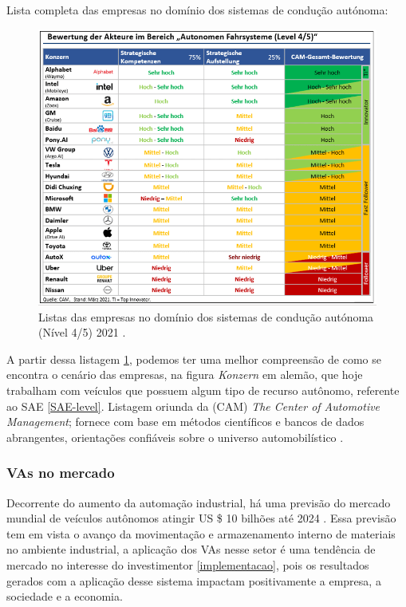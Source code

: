 Lista completa das empresas no domínio dos sistemas de condução autónoma:


\begin{figure}[H]
\centering
\includegraphics[width=16cm]{Figures/grafik.png}
\caption{Listas das empresas no domínio dos sistemas de condução autónoma (Nível 4/5) 2021 \cite{CAM}.}
\label{figura_companies}
\end{figure}

A partir dessa listagem \ref{figura_companies}, podemos ter uma melhor compreensão de como se encontra o cenário das empresas, na figura \textit{Konzern} em alemão, que hoje trabalham com veículos que possuem algum tipo de recurso autônomo, referente ao SAE \ref{SAE-level}. Listagem oriunda da (CAM) \textit{The Center of Automotive Management}; fornece com base em métodos científicos e bancos de dados abrangentes, orientações confiáveis sobre o universo automobilístico \cite{CAM}.

\subsubsection{VAs no mercado}

Decorrente  do aumento da automação industrial, há uma previsão do mercado mundial de veículos autônomos atingir US \$ 10 bilhões até 2024 \cite{mercadoo}. Essa previsão tem em vista o avanço da movimentação e armazenamento interno de materiais no ambiente industrial, a aplicação dos VAs nesse setor é uma tendência de mercado no interesse do investimentor \ref{implementacao}, pois os resultados gerados com a aplicação desse sistema impactam positivamente a empresa, a sociedade e a economia.

